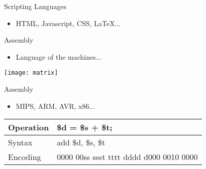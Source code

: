 \begin{frame}[fragile]{Scripting Languages}
\begin{itemize}
\item HTML, Javascript, CSS, \LaTeX...
\end{itemize}
\begin{semiverbatim}\end{semiverbatim}
\end{frame}


\begin{frame}{Assembly}
\begin{itemize}
\item Language of the machines... \pause
\end{itemize}
\begin{center}
\texttt{[image: matrix]}
\end{center}
\end{frame}

\begin{frame}[fragile]{Assembly}
\begin{itemize}
\item MIPS, ARM, AVR, x86...
\end{itemize}
\begin{center}
\begin{tabular}{|l|l|}\hline
Operation & \$d = \$s + \$t;\\ \hline
Syntax & add \$d, \$s, \$t \\ \hline
Encoding & 0000 00ss ssst tttt dddd d000 0010 0000 \\ \hline
\end{tabular}
\end{center}
\end{frame}


